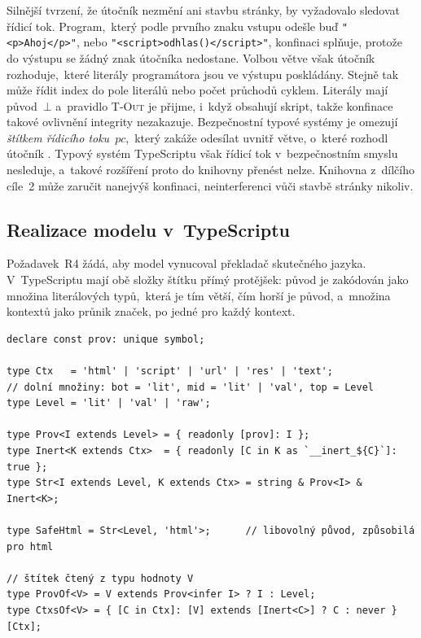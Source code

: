 Silnější tvrzení, že útočník nezmění ani stavbu stránky, by vyžadovalo sledovat řídicí tok. Program,~který podle prvního znaku vstupu odešle buď \verb|"<p>Ahoj</p>"|, nebo \verb|"<script>odhlas()</script>"|, konfinaci splňuje, protože do výstupu se žádný znak útočníka nedostane. Volbou větve však útočník rozhoduje,~které literály programátora jsou ve výstupu poskládány. Stejně tak může řídit index do pole literálů nebo počet průchodů cyklem. Literály mají původ~$\bot$ a~pravidlo \textsc{T-Out} je přijme, i~když obsahují skript, takže konfinace takové ovlivnění integrity nezakazuje. Bezpečnostní typové systémy je omezují \emph{štítkem řídicího toku}~$\mathit{pc}$,~který zakáže odesílat uvnitř větve, o~které rozhodl útočník \parencite{volpano1996sound,sabelfeld2003language}. Typový systém TypeScriptu však řídicí tok v~bezpečnostním smyslu nesleduje, a~takové rozšíření proto do knihovny přenést nelze. Knihovna z~dílčího cíle~2 může zaručit nanejvýš konfinaci, neinterferenci vůči stavbě stránky nikoliv.

\subsection{Realizace modelu v~TypeScriptu}
\label{sec:model-typescript}

Požadavek~R4 žádá, aby model vynucoval překladač skutečného jazyka. V~TypeScriptu mají obě složky štítku přímý protějšek: původ je zakódován jako množina literálových typů,~která je tím větší, čím horší je původ, a~množina kontextů jako průnik značek, po jedné pro každý kontext.

\begin{verbatim}
declare const prov: unique symbol;

type Ctx   = 'html' | 'script' | 'url' | 'res' | 'text';
// dolní množiny: bot = 'lit', mid = 'lit' | 'val', top = Level
type Level = 'lit' | 'val' | 'raw';

type Prov<I extends Level> = { readonly [prov]: I };
type Inert<K extends Ctx>  = { readonly [C in K as `__inert_${C}`]: true };
type Str<I extends Level, K extends Ctx> = string & Prov<I> & Inert<K>;

type SafeHtml = Str<Level, 'html'>;      // libovolný původ, způsobilá pro html

// štítek čtený z typu hodnoty V
type ProvOf<V> = V extends Prov<infer I> ? I : Level;
type CtxsOf<V> = { [C in Ctx]: [V] extends [Inert<C>] ? C : never }[Ctx];
\end{verbatim}

